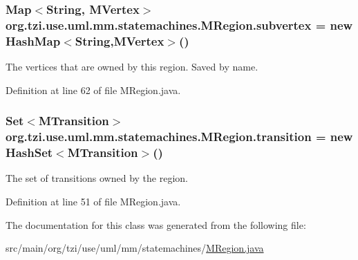 \hypertarget{classorg_1_1tzi_1_1use_1_1uml_1_1mm_1_1statemachines_1_1_m_region_aae24f4f3b13d9d4d6af46decbdb25876}{
\subsubsection[{subvertex}]{\setlength{\rightskip}{0pt plus 5cm}Map$<$String, {\bf M\-Vertex}$>$ org.\-tzi.\-use.\-uml.\-mm.\-statemachines.\-M\-Region.\-subvertex = new Hash\-Map$<$String,{\bf M\-Vertex}$>$()\hspace{0.3cm}{\ttfamily [protected]}}}\label{classorg_1_1tzi_1_1use_1_1uml_1_1mm_1_1statemachines_1_1_m_region_aae24f4f3b13d9d4d6af46decbdb25876}
The vertices that are owned by this region. Saved by name. 

Definition at line 62 of file M\-Region.\-java.

\hypertarget{classorg_1_1tzi_1_1use_1_1uml_1_1mm_1_1statemachines_1_1_m_region_abd3bcba4d92d06c6b0962474302e6eaa}{
\subsubsection[{transition}]{\setlength{\rightskip}{0pt plus 5cm}Set$<${\bf M\-Transition}$>$ org.\-tzi.\-use.\-uml.\-mm.\-statemachines.\-M\-Region.\-transition = new Hash\-Set$<${\bf M\-Transition}$>$()\hspace{0.3cm}{\ttfamily [protected]}}}\label{classorg_1_1tzi_1_1use_1_1uml_1_1mm_1_1statemachines_1_1_m_region_abd3bcba4d92d06c6b0962474302e6eaa}
The set of transitions owned by the region. 

Definition at line 51 of file M\-Region.\-java.



The documentation for this class was generated from the following file\-:\begin{DoxyCompactItemize}
\item 
src/main/org/tzi/use/uml/mm/statemachines/\hyperlink{_m_region_8java}{M\-Region.\-java}\end{DoxyCompactItemize}
